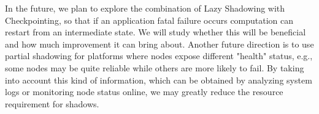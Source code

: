 In the future, we plan to explore the combination of Lazy Shadowing with Checkpointing, so that if an application fatal failure occurs computation can restart from an intermediate state. We will study whether this will be beneficial and how much improvement it can bring about. 
Another future direction is to use partial shadowing for platforms where nodes expose different "health" status, e.g., some nodes may be quite reliable while others are more likely to fail. By taking into account this kind of information, which can be obtained by analyzing system logs or monitoring node status online, we may greatly reduce the resource requirement for shadows.

